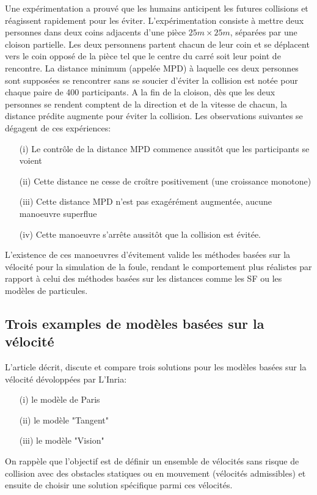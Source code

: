 \documentclass[11pt]{article}
\begin{document}
Une expérimentation a prouvé que les humains anticipent les futures collisions et réagissent rapidement pour les éviter. L'expérimentation consiste à mettre deux personnes dans deux coins adjacents d'une pièce $25m \times 25m$, séparées par une cloison partielle. Les deux personnens partent chacun de leur coin et se déplacent vers le coin opposé de la pièce tel que le centre du carré soit leur point de rencontre. La distance minimum (appelée MPD) à laquelle ces deux personnes sont supposées se rencontrer sans se soucier d'éviter la collision est notée pour chaque paire de 400 participants. A la fin de la cloison, dès que les deux personnes se rendent comptent de la direction et de la vitesse de chacun, la distance prédite augmente pour éviter la collision. Les observations suivantes se dégagent de ces expériences:

\begin{itemize}
	\item[(i)] Le contrôle de la distance MPD commence aussitôt que les participants se voient
	\item[(ii)] Cette distance ne cesse de croître positivement (une croissance monotone)
	\item[(iii)] Cette distance MPD n'est pas exagérément augmentée, aucune manoeuvre superflue 
	\item[(iv)] Cette manoeuvre s'arrête aussitôt que la collision est évitée.
\end{itemize}


L'existence de ces manoeuvres d'évitement valide les méthodes basées sur la vélocité pour la simulation de la foule, rendant le comportement plus réalistes par rapport à celui des méthodes basées sur les distances comme les SF ou les modèles de particules.

\subsection{Trois examples de modèles basées sur la vélocité}

L'article décrit, discute et compare trois solutions pour les modèles basées sur la vélocité dévoloppées par L'Inria:
\begin{itemize}
	\item[(i)] le modèle de Paris
	\item[(ii)] le modèle "Tangent"
	\item[(iii)] le modèle "Vision"
\end{itemize}

On rappèle que l'objectif est de définir un ensemble de vélocités sans risque de collision avec des obstacles statiques ou en mouvement (vélocités admissibles) et ensuite de choisir une solution spécifique parmi ces vélocités.
\end{document}
